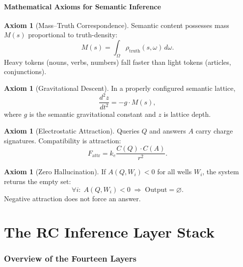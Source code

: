 \documentclass[11pt,twoside]{article}
\theoremstyle{plain}
\theoremstyle{definition}
\newtheorem{axiom}[theorem]{Axiom}
\theoremstyle{remark}
\begin{document}
\subsection{Mathematical Axioms for Semantic Inference}

\begin{axiom}[Mass--Truth Correspondence]\label{ax:mass}
Semantic content possesses mass $M(s)$ proportional to truth-density:
\begin{equation}
  M(s) = \int_\Omega \rho_{\mathrm{truth}}(s,\omega)\,d\omega.
\end{equation}
Heavy tokens (nouns, verbs, numbers) fall faster than light tokens (articles, conjunctions).
\end{axiom}

\begin{axiom}[Gravitational Descent]\label{ax:grav}
In a properly configured semantic lattice,
\begin{equation}
  \frac{d^2 z}{dt^2} = -g\cdot M(s),
\end{equation}
where $g$ is the semantic gravitational constant and $z$ is lattice depth.
\end{axiom}

\begin{axiom}[Electrostatic Attraction]\label{ax:elec}
Queries $Q$ and answers $A$ carry charge signatures.  Compatibility is
attraction:
\begin{equation}
  F_{\mathrm{attr}} = k_e \frac{C(Q)\cdot C(A)}{r^2}.
\end{equation}
\end{axiom}

\begin{axiom}[Zero Hallucination]\label{ax:zh}
If $A(Q,W_i)<0$ for all wells $W_i$, the system returns the empty set:
\begin{equation}
  \forall i:\; A(Q,W_i) < 0 \;\Longrightarrow\; \mathrm{Output} = \varnothing.
\end{equation}
Negative attraction does not force an answer.
\end{axiom}

\part{The RC Inference Layer Stack}

\section{Overview of the Fourteen Layers}
\end{document}
